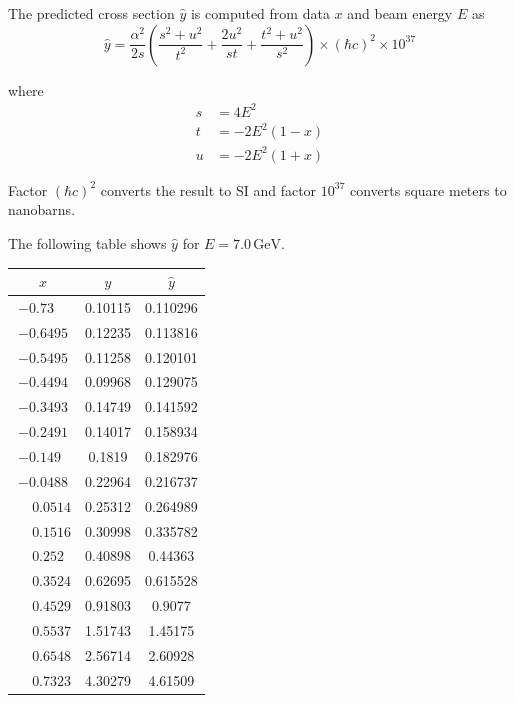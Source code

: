 \documentclass[12pt]{article}
\begin{document}
\noindent
The predicted cross section $\hat{y}$ is computed from data $x$ and beam energy $E$ as
\begin{equation*}
\hat{y}
=\frac{\alpha^2}{2s}
\left(\frac{s^2+u^2}{t^2}+\frac{2u^2}{st}+\frac{t^2+u^2}{s^2}\right)
\times(\hbar c)^2
\times10^{37}
\end{equation*}

\noindent
where
\begin{align*}
s&=4E^2
\\
t&=-2E^2(1-x)
\\
u&=-2E^2(1+x)
\end{align*}

\noindent
Factor $(\hbar c)^2$ converts the result to SI and factor $10^{37}$ converts square meters to nanobarns.

\bigskip
\noindent
The following table shows $\hat{y}$ for $E=7.0\,\text{GeV}$.

\begin{center}
\begin{tabular}{|c|c|c|}
\hline
$x$ & $y$ & $\hat{y}$\\
\hline
$-0.73\phantom{00}$ & 0.10115 & 0.110296\\
$-0.6495$ & 0.12235 & 0.113816\\
$-0.5495$ & 0.11258 & 0.120101\\
$-0.4494$ & 0.09968 & 0.129075\\
$-0.3493$ & 0.14749 & 0.141592\\
$-0.2491$ & 0.14017 & 0.158934\\
$-0.149\phantom{0}$ & 0.1819\phantom{0} & 0.182976\\
$-0.0488$ & 0.22964 & 0.216737\\
$\phantom{+}0.0514$ & 0.25312 & 0.264989\\
$\phantom{+}0.1516$ & 0.30998 & 0.335782\\
$\phantom{+}0.252\phantom{0}$ & 0.40898 & 0.44363\phantom{0}\\
$\phantom{+}0.3524$ & 0.62695 & 0.615528\\
$\phantom{+}0.4529$ & 0.91803 & 0.9077\phantom{00}\\
$\phantom{+}0.5537$ & 1.51743 & 1.45175\phantom{0}\\
$\phantom{+}0.6548$ & 2.56714 & 2.60928\phantom{0}\\
$\phantom{+}0.7323$ & 4.30279 & 4.61509\phantom{0}\\
\hline
\end{tabular}
\end{center}
\end{document}

